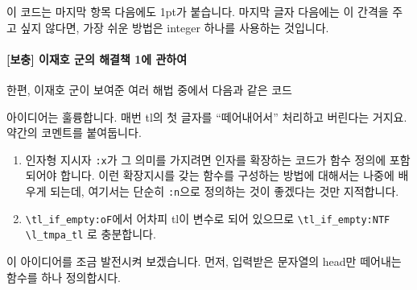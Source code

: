 \documentclass[a4paper,amsmath]{oblivoir}
\begin{document}
이 코드는 마지막 항목 다음에도 1pt가 붙습니다. 마지막 글자 다음에는 이 간격을 주고 싶지 않다면, 가장 쉬운 방법은 integer 하나를 사용하는 것입니다.


\paragraph{[보충] 이재호 군의 해결책 1에 관하여}
한편, 이재호 군이 보여준 여러 해법 중에서 다음과 같은 코드
아이디어는 훌륭합니다. 매번 tl의 첫 글자를 “떼어내어서” 처리하고 버린다는 거지요.
약간의 코멘트를 붙여둡니다.
\begin{enumerate}[코멘트 1]\firmlist
\item 인자형 지시자 \verb|:x|가 그 의미를 가지려면 인자를 확장하는 코드가 함수 정의에 포함되어야 합니다. 이런 확장지시를 갖는 함수를 구성하는 방법에 대해서는 나중에 배우게 되는데, 여기서는 단순히 \verb|:n|으로 정의하는 것이 좋겠다는 것만 지적합니다.
\item \verb|\tl_if_empty:oF|에서 어차피 tl이 변수로 되어 있으므로 \verb|\tl_if_empty:NTF| \verb|\l_tmpa_tl| 로 충분합니다.
\end{enumerate}

이 아이디어를 조금 발전시켜 보겠습니다.
먼저, 입력받은 문자열의 head만 떼어내는 함수를 하나 정의합시다.

\end{document}
